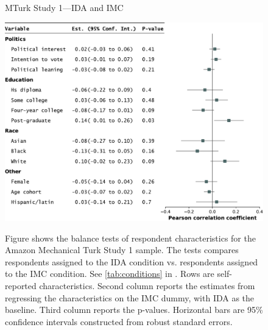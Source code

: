 \begin{center}
	\begin{figure}
		\centering
		\caption{MTurk Study 1---IDA and IMC}
		\includegraphics[width=\textwidth]{../figs/study1-baltest-14k-ips.pdf}
		\label{fig:baltest-24k-rw}
		\caption*{\footnotesize 
			Figure shows the balance tests of respondent characteristics for the Amazon Mechanical Turk Study 1 sample.
			The tests compares respondents assigned to the IDA condition vs. respondents assigned to the IMC condition.
			See \cref{tab:conditions} in .
			Rows are self-reported characteristics.
			Second column reports the estimates from regressing the characteristics on the IMC dummy, with IDA as the baseline.
			Third column reports the p-values.
			Horizontal bars are 95\% confidence intervals constructed from robust standard errors.
		}
	\end{figure}
\end{center}

